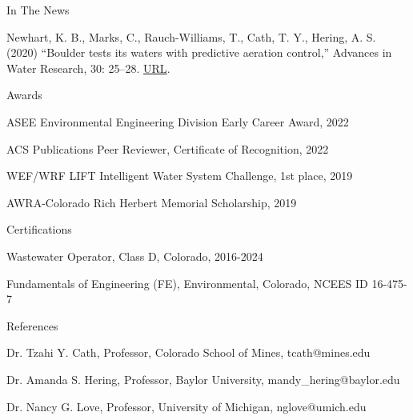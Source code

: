 \documentclass{resume} %
\begin{document}
\begin{rSection}{In The News}

Newhart, K. B., Marks, C., Rauch-Williams, T., Cath, T. Y., Hering, A. S. (2020) “Boulder tests its waters with predictive aeration control,” Advances in Water Research, 30: 25–28. \href{https://www.advancesinwaterresearch.org/awr/20200709/MobilePagedArticle.action?articleId=1621836&pm=1#articleId1621836}{URL}.
\end{rSection}



\begin{rSection}{Awards}

ASEE Environmental Engineering Division Early Career Award, 2022

ACS Publications Peer Reviewer, Certificate of Recognition, 2022

WEF/WRF LIFT Intelligent Water System Challenge, 1st place, 2019

AWRA-Colorado Rich Herbert Memorial Scholarship, 2019

\end{rSection}


\begin{rSection}{Certifications}

Wastewater Operator, Class D, Colorado, 2016-2024

Fundamentals of Engineering (FE), Environmental, Colorado, NCEES ID 16-475-7
\end{rSection}



\begin{rSection}{References}

Dr. Tzahi Y. Cath, Professor, Colorado School of Mines, tcath@mines.edu

Dr. Amanda S. Hering, Professor, Baylor University, mandy\_hering@baylor.edu

Dr. Nancy G. Love, Professor, University of Michigan, nglove@umich.edu

\end{rSection}
\end{document}
